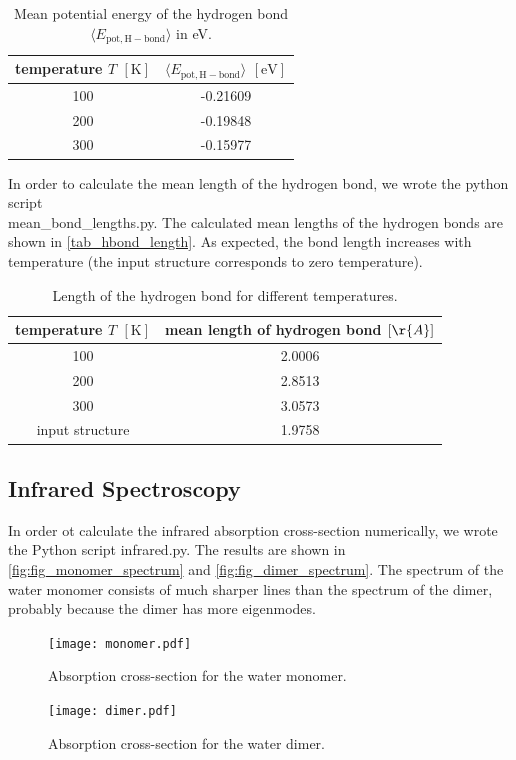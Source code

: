 \documentclass[a4paper,10pt,bibtotoc]{scrartcl}
\begin{document}
\begin{table}[h]
\centering
\caption{Mean potential energy of the hydrogen bond $\langle E_\mathrm{pot,H-bond}\rangle$ in eV.}
\begin{tabular}{@{}cc@{}}
\toprule
temperature $T$ $\left[\mathrm{K}\right]$ & $\langle E_\mathrm{pot,H-bond}\rangle$ $\left[\mathrm{eV}\right]$\\ \midrule
100         &   -0.21609\\
200        &  -0.19848\\
300      &     -0.15977\\ \bottomrule
\end{tabular}
\label{tab_hbond_energy}
\end{table}

\noindent In order to calculate the mean length of the hydrogen bond, we wrote the python script\\ mean\_bond\_lengths.py.
The calculated mean lengths of the hydrogen bonds are shown in \autoref{tab_hbond_length}.
As expected, the bond length increases with temperature (the input structure corresponds to zero temperature).

\begin{table}[h]
\centering
\caption{Length of the hydrogen bond for different temperatures.}
\begin{tabular}{@{}cc@{}}
\toprule
temperature $T$ $\left[\mathrm{K}\right]$ &  mean length of hydrogen bond $\left[\r{A}\right]$\\ \midrule
100  &  2.0006\\
200  &  2.8513\\
300  &  3.0573\\
input structure & 1.9758
\\\bottomrule
\end{tabular}
\label{tab_hbond_length}
\end{table}
\subsection{Infrared Spectroscopy}
In order ot calculate the infrared absorption cross-section numerically, we wrote the Python script infrared.py. 
The results are shown in \autoref{fig:fig_monomer_spectrum} and \autoref{fig:fig_dimer_spectrum}.
The spectrum of the water monomer consists of much sharper lines than the spectrum of the dimer, probably because the dimer has more eigenmodes.
\begin{figure}[H]
\centering
\texttt{[image: monomer.pdf]}
 \caption{Absorption cross-section for the water monomer.}
 \label{fig:fig_monomer_spectrum}
 \texttt{[image: dimer.pdf]}
 \caption{Absorption cross-section for the water dimer.}
 \label{fig:fig_dimer_spectrum}
\end{figure}
\end{document}
